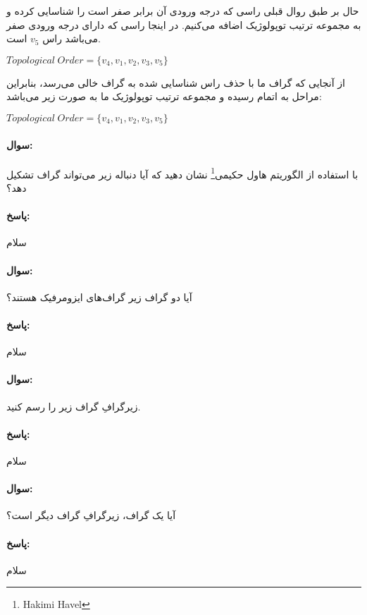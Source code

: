 \documentclass[a4paper,10pt]{article}
\begin{document}
    حال بر طبق روال قبلی راسی که درجه ورودی آن برابر صفر است را شناسایی کرده و به مجموعه ترتیب توپولوژیک اضافه می‌کنیم. در اینجا راسی که دارای درجه ورودی صفر می‌باشد راس $v_5$ است.

    \begin{center}
        
        $Topological \hspace{3pt} Order = \{v_4, v_1, v_2, v_3, v_5\}$

    \end{center}

    از آنجایی که گراف ما با حذف راس شناسایی شده به گراف خالی می‌رسد، بنابراین مراحل به اتمام رسیده و مجموعه ترتیب توپولوژیک ما به صورت زیر می‌باشد:

    \begin{center}
        
        $Topological \hspace{3pt} Order = \{v_4, v_1, v_2, v_3, v_5\}$

    \end{center}

    \noindent\hrulefill

    \paragraph{سوال:} با استفاده از الگوریتم هاول حکیمی\footnote{\hspace{2pt}Hakimi Havel} نشان دهید که آیا دنباله‌ زیر می‌تواند گراف تشکیل دهد؟

    \paragraph{پاسخ:} سلام

    \noindent\hrulefill

    \paragraph{سوال:} آیا دو گراف زیر گراف‌های ایزومرفیک هستند؟

    \paragraph{پاسخ:} سلام

    \noindent\hrulefill

    \paragraph{سوال:} زیرگرافِ گراف زیر را رسم کنید.

    \paragraph{پاسخ:} سلام

    \noindent\hrulefill

    \paragraph{سوال:} آیا یک گراف، زیرگرافِ گراف دیگر است؟
 
    \paragraph{پاسخ:} سلام
\end{document}
